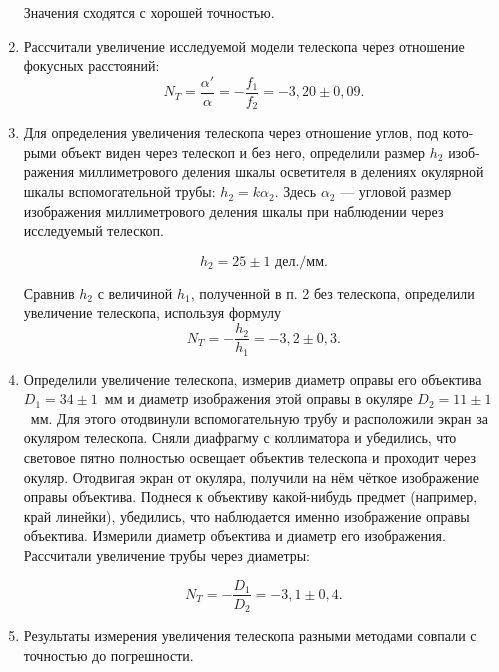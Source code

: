 \documentclass[a4paper, 12pt]{article}%
\begin{document}
\begin{enumerate}
		Значения сходятся с хорошей точностью.
		
		\item Рассчитали увеличение исследуемой модели телескопа через отношение фокусных расстояний:
		\begin{equation*}
		N_T = \dfrac{\alpha'}{\alpha} = -\dfrac{f_1}{f_2} = -3{,}20\pm0{,}09.
		\end{equation*}
		
		\item Для определения увеличения телескопа через отношение углов, под кото-
		рыми объект виден через телескоп и без него, определили размер $h_2$ изоб-
		ражения миллиметрового деления шкалы осветителя в делениях окулярной
		шкалы вспомогательной трубы: $h_2 = k\alpha_2$. Здесь $\alpha_2$ --- угловой размер изображения миллиметрового деления шкалы при наблюдении через исследуемый телескоп.
		
		\begin{equation*}
		h_2 = 25\pm1\text{ дел./мм}.
		\end{equation*}
		
		Сравнив $h_2$ с величиной $h_1$, полученной в п. 2 без телескопа, определили
		увеличение телескопа, используя формулу
		\begin{equation*}
		N_T = -\dfrac{h_2}{h_1} = -3{,}2\pm0{,}3.
		\end{equation*}
		 \item Определили увеличение телескопа, измерив диаметр оправы его объектива $D_1 = 34\pm1$~мм и диаметр изображения этой оправы в окуляре $D_2=11\pm1$~мм. Для этого отодвинули вспомогательную трубу и расположили экран за окуляром телескопа. Сняли диафрагму с коллиматора и убедились, что световое пятно полностью освещает объектив телескопа и проходит через окуляр. Отодвигая экран от окуляра, получили на нём чёткое изображение оправы объектива. Поднеся к объективу какой-нибудь предмет (например, край линейки), убедились, что наблюдается именно изображение оправы объектива. Измерили диаметр объектива и диаметр его изображения. Рассчитали увеличение трубы через диаметры:
		 
		 \begin{equation*}
		 N_T = -\dfrac{D_1}{D_2} = -3{,}1\pm 0{,}4.
		 \end{equation*}
		 
		 \item Результаты измерения увеличения телескопа разными методами совпали с точностью до погрешности.
	\end{enumerate}
\end{document}
